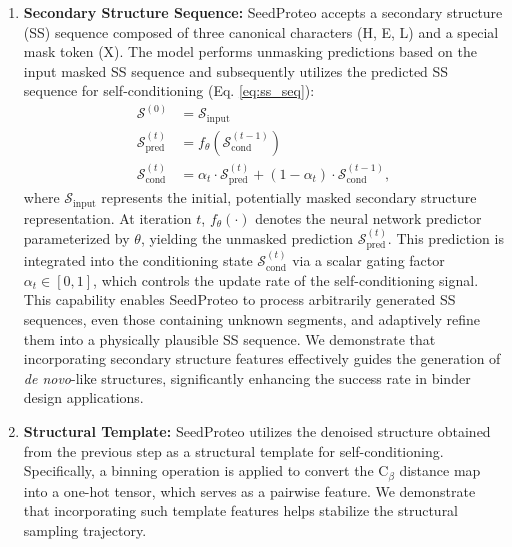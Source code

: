 \documentclass[]{bytedance_seed}
\begin{document}
\begin{enumerate}
    \item \textbf{Secondary Structure Sequence:} SeedProteo accepts a secondary structure (SS) sequence \cite{hekkelman2025dssp} composed of three canonical characters (H, E, L) and a special mask token (X). The model performs unmasking predictions based on the input masked SS sequence and subsequently utilizes the predicted SS sequence for self-conditioning (Eq. \ref{eq:ss_seq}):
\begin{equation}
\label{eq:ss_seq}
\begin{aligned}
    \mathcal{S}^{(0)} &= \mathcal{S}_{\text{input}}  \\
    \mathcal{S}^{(t)}_{\text{pred}} &= f_{\theta}\left(\mathcal{S}^{(t-1)}_{\text{cond}}\right)\\
    \mathcal{S}^{(t)}_{\text{cond}} &= \alpha_t \cdot \mathcal{S}^{(t)}_{\text{pred}} + (1 - \alpha_t) \cdot \mathcal{S}^{(t-1)}_{\text{cond}},
\end{aligned}
\end{equation}
where $\mathcal{S}_{\text{input}}$ represents the initial, potentially masked secondary structure representation. At iteration $t$, $f_{\theta}(\cdot)$ denotes the neural network predictor parameterized by $\theta$, yielding the unmasked prediction $\mathcal{S}^{(t)}_{\text{pred}}$. This prediction is integrated into the conditioning state $\mathcal{S}^{(t)}_{\text{cond}}$ via a scalar gating factor $\alpha_t \in [0, 1]$, which controls the update rate of the self-conditioning signal.
This capability enables SeedProteo to process arbitrarily generated SS sequences, even those containing unknown segments, and adaptively refine them into a physically plausible SS sequence. We demonstrate that incorporating secondary structure features effectively guides the generation of \textit{de novo}-like structures, significantly enhancing the success rate in binder design applications.

    \item \textbf{Structural Template:} SeedProteo utilizes the denoised structure obtained from the previous step as a structural template for self-conditioning. Specifically, a binning operation is applied to convert the C$_\beta$ distance map into a one-hot tensor, which serves as a pairwise feature. We demonstrate that incorporating such template features helps stabilize the structural sampling trajectory.

\end{enumerate}
\end{document}
